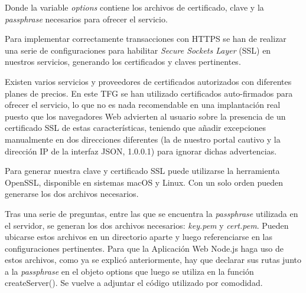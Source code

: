 Donde la variable \emph{options} contiene los archivos de certificado, clave y la \emph{passphrase} necesarios para ofrecer el servicio.

Para implementar correctamente transacciones con HTTPS se han de realizar una serie de configuraciones para habilitar \emph{Secure Sockets Layer} (SSL) en nuestros servicios, generando los certificados y claves pertinentes.

Existen varios servicios y proveedores de certificados autorizados con diferentes planes de precios. En este TFG se han utilizado certificados auto-firmados para ofrecer el servicio, lo que no es nada recomendable en una implantación real puesto que los navegadores Web advierten al usuario sobre la presencia de un certificado SSL de estas características, teniendo que añadir excepciones manualmente en dos direcciones diferentes (la de nuestro portal cautivo y la dirección IP de la interfaz JSON, 1.0.0.1) para ignorar dichas advertencias.

Para generar nuestra clave y certificado SSL puede utilizarse la herramienta OpenSSL, disponible en sistemas macOS y Linux. Con un solo orden pueden generarse los dos archivos necesarios.


Tras una serie de preguntas, entre las que se encuentra la \emph{passphrase} utilizada en el servidor, se generan los dos archivos necesarios: \emph{key.pem} y \emph{cert.pem}. Pueden ubicarse estos archivos en un directorio aparte y luego referenciarse en las configuraciones pertinentes. Para que la Aplicación Web Node.js haga uso de estos archivos, como ya se explicó anteriormente, hay que declarar sus rutas junto a la \emph{passphrase} en el objeto options que luego se utiliza en la función createServer(). Se vuelve a adjuntar el código utilizado por comodidad.


